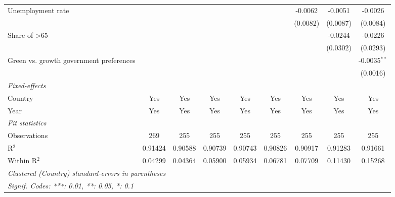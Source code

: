 \begin{table}[htbp]
\begin{tabular}{lcccccccc}
      Unemployment rate                           &               &              &          &          &          & -0.0062                & -0.0051  & -0.0026\\   
                                                  &               &              &          &          &          & (0.0082)               & (0.0087) & (0.0084)\\   
      Share of >65                                &               &              &          &          &          &                        & -0.0244  & -0.0226\\   
                                                  &               &              &          &          &          &                        & (0.0302) & (0.0293)\\   
      Green vs. growth government preferences     &               &              &          &          &          &                        &          & -0.0035$^{**}$\\   
                                                  &               &              &          &          &          &                        &          & (0.0016)\\   
      \midrule
      \emph{Fixed-effects}\\
      Country                                     & Yes           & Yes          & Yes      & Yes      & Yes      & Yes                    & Yes      & Yes\\  
      Year                                        & Yes           & Yes          & Yes      & Yes      & Yes      & Yes                    & Yes      & Yes\\  
      \midrule
      \emph{Fit statistics}\\
      Observations                                & 269           & 255          & 255      & 255      & 255      & 255                    & 255      & 255\\  
      R$^2$                                       & 0.91424       & 0.90588      & 0.90739  & 0.90743  & 0.90826  & 0.90917                & 0.91283  & 0.91661\\  
      Within R$^2$                                & 0.04299       & 0.04364      & 0.05900  & 0.05934  & 0.06781  & 0.07709                & 0.11430  & 0.15268\\  
      \midrule \midrule
      \multicolumn{9}{l}{\emph{Clustered (Country) standard-errors in parentheses}}\\
      \multicolumn{9}{l}{\emph{Signif. Codes: ***: 0.01, **: 0.05, *: 0.1}}\\
   \end{tabular}
\end{table}


